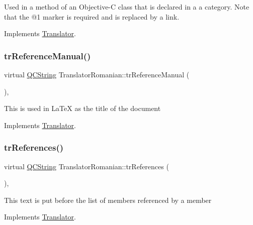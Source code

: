 Used in a method of an Objective-\/C class that is declared in a a category. Note that the @1 marker is required and is replaced by a link. 

Implements \mbox{\hyperlink{class_translator}{Translator}}.

\mbox{\label{class_translator_romanian_aad40cfeac5b83a4e1af5efceef3b5f6e}} 
\subsubsection{\texorpdfstring{trReferenceManual()}{trReferenceManual()}}
{\footnotesize\ttfamily virtual \mbox{\hyperlink{class_q_c_string}{Q\+C\+String}} Translator\+Romanian\+::tr\+Reference\+Manual (\begin{DoxyParamCaption}{ }\end{DoxyParamCaption})\hspace{0.3cm}{\ttfamily [inline]}, {\ttfamily [virtual]}}

This is used in La\+TeX as the title of the document 

Implements \mbox{\hyperlink{class_translator}{Translator}}.

\mbox{\label{class_translator_romanian_a0860562484f31dc3d02e75d3481c69b7}} 
\subsubsection{\texorpdfstring{trReferences()}{trReferences()}}
{\footnotesize\ttfamily virtual \mbox{\hyperlink{class_q_c_string}{Q\+C\+String}} Translator\+Romanian\+::tr\+References (\begin{DoxyParamCaption}{ }\end{DoxyParamCaption})\hspace{0.3cm}{\ttfamily [inline]}, {\ttfamily [virtual]}}

This text is put before the list of members referenced by a member 

Implements \mbox{\hyperlink{class_translator}{Translator}}.

\mbox{\label{class_translator_romanian_a81de740ff868dad8b4e145084f25c7c7}} 
